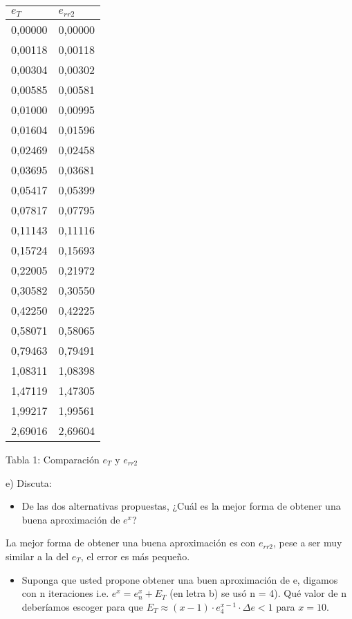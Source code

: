 \documentclass[]{article}
\begin{document}
\begin{tabular}{|r|r|}
	
		\toprule
		\multicolumn{1}{|l|}{$e_{T}$} & \multicolumn{1}{l|}{$e_{rr2}$} \\
		\midrule
		0,00000 & 0,00000 \\
		\midrule
		0,00118 & 0,00118 \\
		\midrule
		0,00304 & 0,00302 \\
		\midrule
		0,00585 & 0,00581 \\
		\midrule
		0,01000 & 0,00995 \\
		\midrule
		0,01604 & 0,01596 \\
		\midrule
		0,02469 & 0,02458 \\
		\midrule
		0,03695 & 0,03681 \\
		\midrule
		0,05417 & 0,05399 \\
		\midrule
		0,07817 & 0,07795 \\
		\midrule
		0,11143 & 0,11116 \\
		\midrule
		0,15724 & 0,15693 \\
		\midrule
		0,22005 & 0,21972 \\
		\midrule
		0,30582 & 0,30550 \\
		\midrule
		0,42250 & 0,42225 \\
		\midrule
		0,58071 & 0,58065 \\
		\midrule
		0,79463 & 0,79491 \\
		\midrule
		1,08311 & 1,08398 \\
		\midrule
		1,47119 & 1,47305 \\
		\midrule
		1,99217 & 1,99561 \\
		\midrule
		2,69016 & 2,69604 \\
		\bottomrule
\end{tabular}
\label{tab:comparar}
\begin{flushleft}
	Tabla 1: Comparación $e_{T}$ y $e_{rr2}$
\end{flushleft}



\begin{flushleft}
	e) Discuta:
\end{flushleft}

\begin{itemize}
	\item De las dos alternativas propuestas, ¿Cuál es la mejor forma de obtener una buena aproximación de $e^{x}$?
\end{itemize}

\begin{flushleft}
	La mejor forma de obtener una buena aproximación es con $e_{rr2}$, pese a ser muy similar a la del $e_{T}$, el error es más pequeño.
\end{flushleft}
\begin{itemize}
	\item Suponga que usted propone obtener una buen aproximación de e, digamos con n iteraciones i.e. $e^{x} = e_{n}^{x} + E_{T}$ (en letra b) se usó n = 4). Qué valor de n deberíamos escoger para que $E_{T} \approx (x-1) \cdot e_{4}^{x-1} \cdot \Delta e < 1$ para $x = 10$. \\
\end{itemize}
\end{document}
